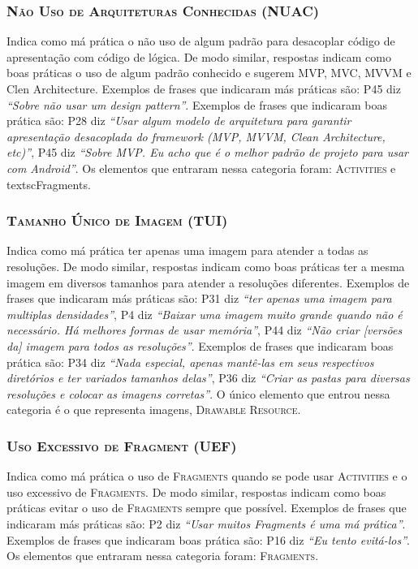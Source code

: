 \subsubsection{\textsc{Não Uso de Arquiteturas Conhecidas (NUAC)}}
Indica como má prática o não uso de algum padrão para desacoplar código de apresentação com código de lógica. De modo similar, respostas indicam como boas práticas o uso de algum padrão conhecido e sugerem MVP, MVC, MVVM e Clen Architecture. Exemplos de frases que indicaram más práticas são: P45 diz \textit{``Sobre não usar um design pattern''}. Exemplos de frases que indicaram boas prática são: P28 diz \textit{``Usar algum modelo de arquitetura para garantir apresentação desacoplada do framework (MVP, MVVM, Clean Architecture, etc)''}, P45 diz \textit{``Sobre MVP. Eu acho que é o melhor padrão de projeto para usar com Android''}. Os elementos que entraram nessa categoria foram: \textsc{Activities} e textsc{Fragments}. 

\subsubsection{\textsc{Tamanho Único de Imagem (TUI)}}
Indica como má prática ter apenas uma imagem para atender a todas as resoluções. De modo similar, respostas indicam como boas práticas ter a mesma imagem em diversos tamanhos para atender a resoluções diferentes. Exemplos de frases que indicaram más práticas são: P31 diz \textit{``ter apenas uma imagem para multiplas densidades''}, P4 diz \textit{``Baixar uma imagem muito grande quando não é necessário. Há melhores formas de usar memória''}, P44 diz \textit{``Não criar [versões da] imagem para todos as resoluções''}. Exemplos de frases que indicaram boas prática são: P34 diz \textit{``Nada especial, apenas mantê-las em seus respectivos diretórios e ter variados tamanhos delas''}, P36 diz \textit{``Criar as pastas para diversas resoluções e colocar as imagens corretas''}. O único elemento que entrou nessa categoria é o que representa imagens, \textsc{Drawable Resource}.

\subsubsection{\textsc{Uso Excessivo de Fragment (UEF)}}
Indica como má prática o uso de \textsc{Fragments} quando se pode usar \textsc{Activities} e o uso excessivo de \textsc{Fragments}. De modo similar, respostas indicam como boas práticas evitar o uso de \textsc{Fragments} sempre que possível. Exemplos de frases que indicaram más práticas são: P2 diz \textit{``Usar muitos Fragments é uma má prática''}. Exemplos de frases que indicaram boas prática são: P16 diz \textit{``Eu tento evitá-los''}. Os elementos que entraram nessa categoria foram: \textsc{Fragments}. 

